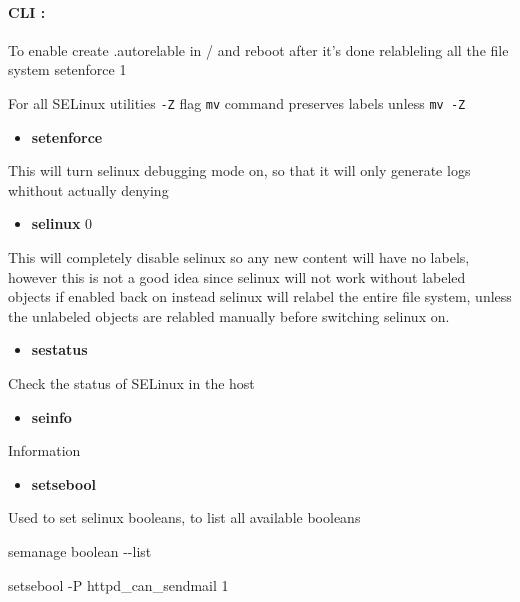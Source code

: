 \documentclass[
  14pt,
  english,
  a4paper,
]{scrreprt}
\newenvironment{Shaded}{}{}
\newcommand{\ExtensionTok}[1]{#1}
\newcommand{\NormalTok}[1]{#1}
\providecommand{\tightlist}{%
  \setlength{\itemsep}{0pt}\setlength{\parskip}{0pt}}
\begin{document}
\begin{quote}
\end{quote}

\hypertarget{cli}{%
\paragraph{CLI :}\label{cli}}

To enable create .autorelable in / and reboot after it's done
relableling all the file system setenforce 1

For all SELinux utilities \texttt{-Z} flag \texttt{mv} command preserves
labels unless \texttt{mv\ -Z}

\begin{itemize}
\tightlist
\item
  \textbf{setenforce}
\end{itemize}

This will turn selinux debugging mode on, so that it will only generate
logs whithout actually denying

\begin{itemize}
\tightlist
\item
  \textbf{selinux} 0
\end{itemize}

This will completely disable selinux so any new content will have no
labels, however this is not a good idea since selinux will not work
without labeled objects if enabled back on instead selinux will relabel
the entire file system, unless the unlabeled objects are relabled
manually before switching selinux on.

\begin{itemize}
\tightlist
\item
  \textbf{sestatus}
\end{itemize}

Check the status of SELinux in the host

\begin{itemize}
\tightlist
\item
  \textbf{seinfo}
\end{itemize}

Information

\begin{itemize}
\tightlist
\item
  \textbf{setsebool}
\end{itemize}

Used to set selinux booleans, to list all available booleans

\begin{Shaded}
\begin{Highlighting}[]
\ExtensionTok{semanage}\NormalTok{ boolean {-}{-}list}

\ExtensionTok{setsebool}\NormalTok{ {-}P httpd\_can\_sendmail 1}
\end{Highlighting}
\end{Shaded}
\end{document}
